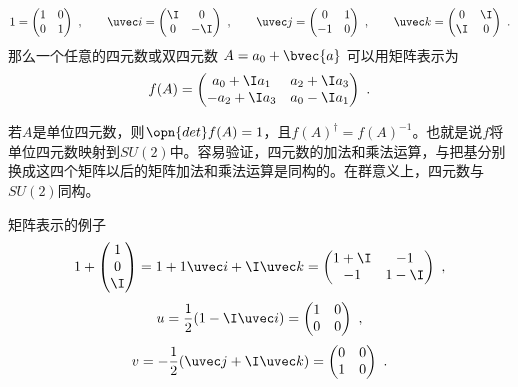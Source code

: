 \begin{equation}
1=\begin{pmatrix}1&0\\0&1\end{pmatrix} ~,
\qquad
\uvec i=\begin{pmatrix}\I&0\\0&-\I\end{pmatrix}~,
\qquad
\uvec j=\begin{pmatrix}0&1\\-1&0\end{pmatrix}~,
\qquad
\uvec k=\begin{pmatrix}0&\I\\\I&0\end{pmatrix} ~.
\end{equation}
那么一个任意的四元数或双四元数 $A=a_0+\bvec{a}$ 可以用矩阵表示为
\begin{equation}
f(A)=\begin{pmatrix}a_0+\I a_1&a_2+\I a_3\\-a_2+\I a_3&a_0-\I a_1 \end{pmatrix} ~.
\end{equation}

若$A$是单位四元数，则$\opn{det}f(A)=1$，且$f(A)^{\dagger}=f(A)^{-1}$。也就是说$f$将单位四元数映射到$SU(2)$中。容易验证，四元数的加法和乘法运算，与把基分别换成这四个矩阵以后的矩阵加法和乘法运算是同构的。在群意义上，四元数与$SU(2)$同构。

\begin{example}{矩阵表示的例子}\label{ex_Quat_1}
\begin{equation}
1+\begin{pmatrix}1\\0\\\I\end{pmatrix} =1+1\uvec i+\I\uvec k =\begin{pmatrix}1+\I&-1\\-1&1-\I\end{pmatrix} ~,
\end{equation}
\begin{equation}
u=\frac{1}{2}(1-\I\uvec i)=\begin{pmatrix}1&0\\0&0\end{pmatrix} ~,
\end{equation}
\begin{equation}
v=-\frac{1}{2}(\uvec j+\I\uvec k)=\begin{pmatrix}0&0\\1&0\end{pmatrix} ~.
\end{equation}
\end{example}

